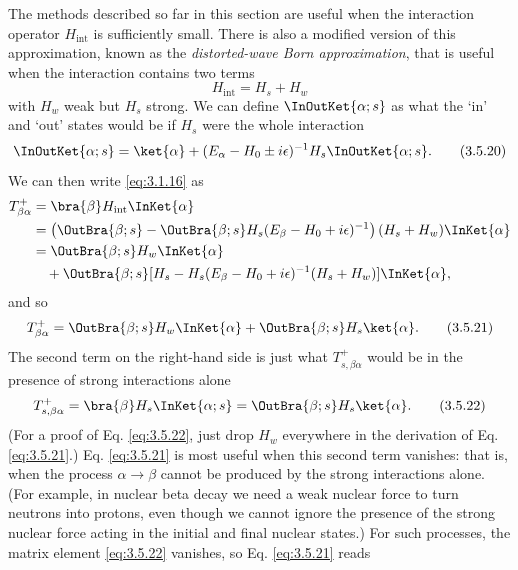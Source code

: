 The methods described so far in this section are useful when the interaction operator
$H_{\mathrm{int}}$ is sufficiently small. There is also a modified version of this approximation,
known as the \emph{distorted-wave Born approximation}, that is useful when the interaction
contains two terms
\begin{equation}
 H_{\mathrm{int}}=H_s+H_w
 \tag{3.5.19}\label{eq:3.5.19}
\end{equation}
with $H_w$ weak but $H_s$ strong. We can define $\InOutKet{\alpha;s}$ as what the
`in' and `out' states would be if $H_s$ were the whole interaction
\begin{equation}
 \InOutKet{\alpha;s}=\ket{\alpha}
 +(E_\alpha-H_0\pm i\epsilon)^{-1}H_s\InOutKet{\alpha;s}.
 \tag{3.5.20}\label{eq:3.5.20}
\end{equation}
We can then write \eqref{eq:3.1.16} as
\begin{align*}
 T^+_{\beta\alpha}
 &=\bra{\beta}H_{\mathrm{int}}\InKet{\alpha}\\
 &=\left(\OutBra{\beta;s}-\OutBra{\beta;s}H_s(E_\beta-H_0+i\epsilon)^{-1}\right)
 (H_s+H_w)\InKet{\alpha}\\
 &=\OutBra{\beta;s}H_w\InKet{\alpha}\\
 &\quad+\OutBra{\beta;s}
 [H_s-H_s(E_\beta-H_0+i\epsilon)^{-1}(H_s+H_w)]
 \InKet{\alpha},
\end{align*}
and so
\begin{equation}
 T^+_{\beta\alpha}=\OutBra{\beta;s}H_w\InKet{\alpha}
 +\OutBra{\beta;s}H_s\ket{\alpha}.
 \tag{3.5.21}\label{eq:3.5.21}
\end{equation}
The second term on the right-hand side is just what $T^+_{s,\beta\alpha}$ would be in the
presence of strong interactions alone
\begin{equation}
 T^+_{s,\beta\alpha}=\bra{\beta}H_s\InKet{\alpha;s}
 =\OutBra{\beta;s}H_s\ket{\alpha}.
 \tag{3.5.22}\label{eq:3.5.22}
\end{equation}
(For a proof of Eq. \eqref{eq:3.5.22}, just drop $H_w$ everywhere in the derivation of Eq. \eqref{eq:3.5.21}.)
Eq. \eqref{eq:3.5.21} is most useful when this second term vanishes: that is, when the process
$\alpha\to\beta$ cannot be produced by the strong interactions alone. (For example, in nuclear
beta decay we need a weak nuclear force to turn neutrons into protons, even though we cannot
ignore the presence of the strong nuclear force acting in the initial and final nuclear states.)
For such processes, the matrix element \eqref{eq:3.5.22} vanishes, so Eq. \eqref{eq:3.5.21} reads
